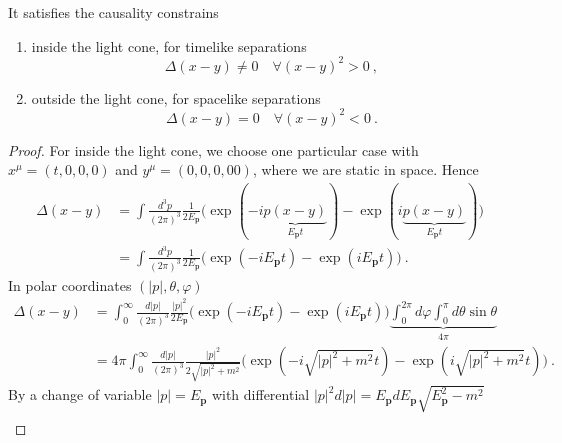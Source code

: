     It satisfies the causality constrains
    \begin{enumerate}
        \item inside the light cone, for timelike separations
            \begin{equation*}
                \Delta (x - y) \neq 0 \quad \forall (x - y)^2 > 0 ~,
            \end{equation*}
        \item outside the light cone, for spacelike separations
            \begin{equation*}
                \Delta (x - y) = 0 \quad \forall (x - y)^2 < 0 ~.
            \end{equation*}
    \end{enumerate}
    \begin{proof}
        For inside the light cone, we choose one particular case with $x^\mu = (t, 0, 0, 0)$ and $y^\mu = (0, 0, 0,0 0)$, where we are static in space. Hence 
        \begin{equation*}
        \begin{aligned}
        \Delta (x - y) & = \int \frac{d^3 p}{(2 \pi)^3} \frac{1}{2 E_{\mathbf p}} \Big ( \exp(- i \underbrace{p (x - y)}_{E_{\mathbf p} t}) - \exp(i \underbrace{p (x - y)}_{E_{\mathbf p} t}) \Big) \\ & = \int \frac{d^3 p}{(2 \pi)^3} \frac{1}{2 E_{\mathbf p}} \Big ( \exp(- i E_{\mathbf p} t) - \exp(i E_{\mathbf p} t) \Big) ~.
        \end{aligned}
        \end{equation*}
        In polar coordinates $(|p|, \theta, \varphi)$
        \begin{equation*}
        \begin{aligned}
        \Delta (x - y) & = \int_0^\infty \frac{d|p|}{(2 \pi)^3} \frac{|p|^2}{2 E_{\mathbf p}} \Big ( \exp(- i E_{\mathbf p} t) - \exp(i E_{\mathbf p} t) \Big) \underbrace{\int_0^{2\pi} d\varphi \int_0^\pi d\theta \sin \theta}_{4\pi} \\ & = 4 \pi \int_0^\infty \frac{d|p|}{(2 \pi)^3} \frac{|p|^2}{2 \sqrt{|p|^2 + m^2}} \Big ( \exp(- i \sqrt{|p|^2 + m^2} t) - \exp(i \sqrt{|p|^2 + m^2} t) \Big) ~.
        \end{aligned}
        \end{equation*}
        By a change of variable $|p| = E_{\mathbf p}$ with differential $|p|^2 d|p| = E_{\mathbf p} d E_{\mathbf p} \sqrt{E_{\mathbf p}^2 - m^2}$
        \begin{equation*}
        \begin{aligned}

\end{aligned}
\end{equation*}
\end{proof}
